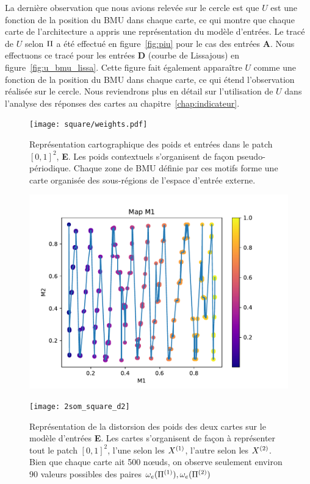 \documentclass[../main]{subfiles}
\begin{document}
La dernière observation que nous avions relevée sur le cercle est que $U$ est une fonction de la position du BMU dans chaque carte, ce qui montre que chaque carte de l'architecture a appris une représentation du modèle d'entrées. Le tracé de $U$ selon $\Pi$ a été effectué en figure~\ref{fig:piu} pour le cas des entrées \textbf{A}.
Nous effectuons ce tracé pour les entrées \textbf{D} (courbe de Lissajous) en figure~\ref{fig:u_bmu_lissa}. 
Cette figure fait également apparaître $U$ comme une fonction de la position du BMU dans chaque carte, ce qui étend l'observation réalisée sur le cercle.
Nous reviendrons plus en détail sur l'utilisation de $U$ dans l'analyse des réponses des cartes au chapitre~\ref{chap:indicateur}.

 \begin{figure}
 \begin{minipage}{\textwidth}
	\centering\texttt{[image: square/weights.pdf]}
	\caption{Représentation cartographique des poids et entrées dans le patch $[0,1]^2$, \textbf{E}. Les poids contextuels s'organisent de façon pseudo-périodique. Chaque zone de BMU définie par ces motifs forme une carte organisée des sous-régions de l'espace d'entrée externe. \label{fig:ind}}

	\hfill\begin{minipage}{0.4\textwidth}
		\includegraphics[width=\textwidth]{2som_square_d}
	\end{minipage}
	\begin{minipage}{0.4\textwidth}
		\texttt{[image: 2som\_square\_d2]}
	\end{minipage}\hfill
	\caption{Représentation de la distorsion des poids des deux cartes sur le modèle d'entrées \textbf{E}. Les cartes s'organisent de façon à représenter tout le patch $[0,1]^2$, l'une selon les $X^{({1})}$, l'autre selon les $X^{({2})}$. Bien que chaque carte ait 500 n\oe{}uds, on observe seulement environ 90 valeurs possibles des paires $\omega_e(\Pi^{({1})}),\omega_e(\Pi^{({2})})$ \label{fig:2som_p_d}}
	

\end{minipage}
\end{figure}
\end{document}
